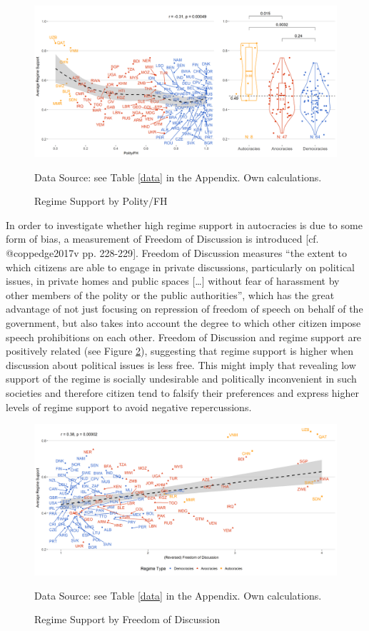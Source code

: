 \documentclass[]{article}
\begin{document}
\begin{figure}[!htb]
    \caption{ Regime Support by Polity/FH}
    \label{comp}
    \includegraphics[width=\textwidth]{images/doubleplot.png}
    \flushright
    {\scriptsize Data Source: see Table \ref{data} in the Appendix. Own calculations.  \par}
\end{figure}

In order to investigate whether high regime support in autocracies is
due to some form of bias, a measurement of Freedom of Discussion is
introduced {[}cf. @coppedge2017v pp. 228-229{]}. Freedom of Discussion
measures ``the extent to which citizens are able to engage in private
discussions, particularly on political issues, in private homes and
public spaces {[}\ldots{}{]} without fear of harassment by other members
of the polity or the public authorities'', which has the great advantage
of not just focusing on repression of freedom of speech on behalf of the
government, but also takes into account the degree to which other
citizen impose speech prohibitions on each other. Freedom of Discussion
and regime support are positively related (see Figure \ref{comp2}),
suggesting that regime support is higher when discussion about political
issues is less free. This might imply that revealing low support of the
regime is socially undesirable and politically inconvenient in such
societies and therefore citizen tend to falsify their preferences and
express higher levels of regime support to avoid negative repercussions.

\begin{figure}[!htb]
    \caption{Regime Support by Freedom of Discussion}
        \label{comp2}
    \includegraphics[width=\textwidth]{images/regimesupport_fod.png}
    \flushright
{\scriptsize Data Source: see Table \ref{data} in the Appendix. Own calculations.  \par}
\end{figure}
\end{document}
